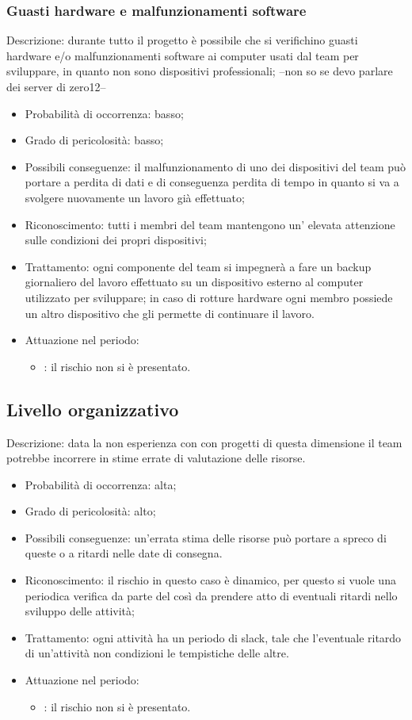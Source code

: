 \documentclass[PianoDiProgetto.tex]{subfiles}
\begin{document}
	\subsubsection{Guasti hardware e malfunzionamenti software}
Descrizione: durante tutto il progetto è possibile che si verifichino guasti hardware e/o malfunzionamenti software ai computer usati dal team per sviluppare, in quanto non sono dispositivi professionali; --{non so se devo parlare dei server di zero12}--
	\begin{itemize}
		\item Probabilità di occorrenza: basso;
		\item Grado di pericolosità: basso;
		\item Possibili conseguenze: il malfunzionamento di uno dei dispositivi del team può portare a perdita di dati e di conseguenza perdita di tempo in quanto si va a svolgere nuovamente un lavoro già effettuato;
		\item Riconoscimento: tutti i membri del team mantengono un' elevata attenzione sulle condizioni dei propri dispositivi;
		\item Trattamento: ogni componente del team si impegnerà a fare un backup giornaliero del lavoro effettuato su un dispositivo esterno al computer utilizzato per sviluppare; in caso di rotture hardware ogni membro possiede un altro dispositivo che gli permette di continuare il lavoro.
		\item Attuazione nel periodo: 
			\begin{itemize}
				\item \ARdoc : il rischio non si è presentato.
			\end{itemize}
	
	\end{itemize}

	\subsection{Livello organizzativo}
Descrizione: data la non esperienza con con progetti di questa dimensione il team potrebbe incorrere in stime errate di valutazione delle risorse.
	\begin{itemize}
		\item Probabilità di occorrenza: alta;
		\item Grado di pericolosità: alto;
		\item Possibili conseguenze: un'errata stima delle risorse può portare a spreco di queste o a ritardi nelle date di consegna.
		\item Riconoscimento: il rischio in questo caso è dinamico, per questo si vuole una periodica verifica da parte del \RESP{} così da prendere atto di eventuali ritardi nello sviluppo delle attività;
		\item Trattamento: ogni attività ha un periodo di slack, tale che l'eventuale ritardo di un'attività non condizioni le tempistiche delle altre.
		\item Attuazione nel periodo: 
			\begin{itemize}
				\item \ARdoc : il rischio non si è presentato.
			\end{itemize}
	\end{itemize}
	
\end{document}
